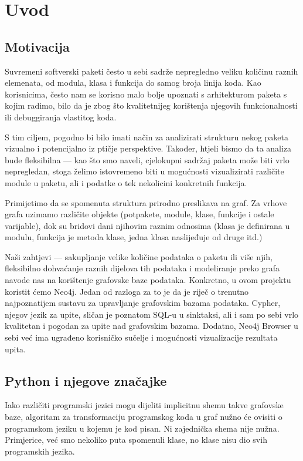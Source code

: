 \section{Uvod} \label{sec:uvod}
\subsection{Motivacija}
Suvremeni softverski paketi često u sebi sadrže nepregledno veliku količinu raznih elemenata, od modula, klasa i funkcija do samog broja linija koda. Kao korisnicima, često nam se korisno malo bolje upoznati s arhitekturom paketa s kojim radimo, bilo da je zbog što kvalitetnijeg korištenja njegovih funkcionalnosti ili debuggiranja vlastitog koda.


S tim ciljem, pogodno bi bilo imati način za analizirati strukturu nekog paketa vizualno i potencijalno iz ptičje perspektive.
 Također, htjeli bismo da ta analiza bude fleksibilna --- kao što smo naveli, cjelokupni sadržaj paketa može biti vrlo nepregledan, stoga želimo istovremeno biti u mogućnosti vizualizirati različite module u paketu, ali i podatke o tek nekolicini konkretnih funkcija.


Primijetimo da se spomenuta struktura prirodno preslikava na graf.
Za vrhove grafa uzimamo različite objekte (potpakete, module, klase, funkcije i ostale varijable), dok su bridovi dani njihovim raznim odnosima (klasa je definirana u modulu, funkcija je metoda klase, jedna klasa naslijeđuje od druge itd.) 


Naši zahtjevi --- sakupljanje velike količine podataka o paketu ili više
njih, fleksibilno dohvaćanje raznih dijelova tih podataka i
modeliranje preko grafa navode nas na korištenje grafovske baze podataka. Konkretno, u ovom projektu koristit ćemo Neo4j.
Jedan od razloga za to je da je riječ o trenutno najpoznatijem sustavu
za upravljanje grafovskim bazama podataka. Cypher, njegov jezik za upite,
sličan je poznatom SQL-u u sinktaksi, ali i sam po sebi vrlo kvalitetan i pogodan za upite nad grafovskim bazama.
Dodatno, Neo4j Browser u sebi već ima ugrađeno korisničko sučelje i
mogućnosti vizualizacije rezultata upita.


\subsection{Python i njegove značajke}
Iako različiti programski jezici mogu dijeliti implicitnu shemu takve
grafovske baze, algoritam za transformaciju programskog koda u graf 
nužno će ovisiti o programskom jeziku u kojemu je kod pisan.
Ni zajednička shema nije nužna. Primjerice, već smo nekoliko puta spomenuli klase, no klase nisu dio svih programskih jezika.


